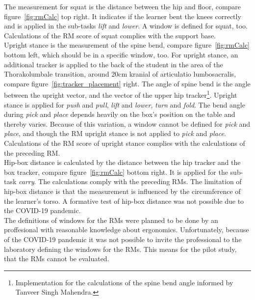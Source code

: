 The measurement for squat is the distance between the hip and floor, compare figure~\ref{fig:rmCalc} top right. It indicates if the learner bent the knees correctly and is applied in the sub-tasks \textit{lift} and \textit{lower}. A window is defined for squat, too. Calculations of the RM score of squat complies with the support base.\\
Upright stance is the measurement of the spine bend, compare figure~\ref{fig:rmCalc} bottom left, which should be in a specific window, too. For upright stance, an additional tracker is applied to the back of the student in the area of the Thorakolumbale transition, around 20cm kranial of articulatio lumbosacralis, compare figure~\ref{fig:tracker_placement} right. The angle of spine bend is the angle between the upright vector, and the vector of the upper hip tracker\footnote{Implementation for the calculations of the spine bend angle informed by Tanveer Singh Mahendra.}. Upright stance is applied for \textit{push} and \textit{pull}, \textit{lift} and \textit{lower}, \textit{turn} and \textit{fold}. The bend angle during \textit{pick} and \textit{place} depends heavily on the box's position on the table and thereby varies. Because of this variation, a window cannot be defined for \textit{pick} and \textit{place}, and though the RM upright stance is not applied to \textit{pick} and \textit{place}. Calculations of the RM score of upright stance complies with the calculations of the preceding RM.\\
Hip-box distance is calculated by the distance between the hip tracker and the box tracker, compare figure~\ref{fig:rmCalc} bottom right. It is applied for the sub-task \textit{carry}. The calculations comply with the preceding RMs. The limitation of hip-box distance is that the measurement is influenced by the circumference of the learner's torso. A formative test of hip-box distance was not possible due to the COVID-19 pandemic.\\

The definitions of windows for the RMs were planned to be done by an proffesional with reasonable knowledge about ergonomics. Unfortunately, because of the COVID-19 pandemic it was not possible to invite the professional to the laboratory defining the windows for the RMs. This means for the pilot study, that the RMs cannot be evaluated.

